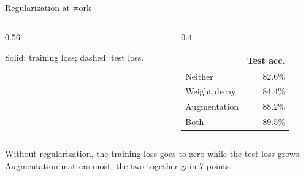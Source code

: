\documentclass[11pt,aspectratio=169]{beamer}
\begin{document}
\begin{frame}{Regularization at work}
\begin{columns}[c,onlytextwidth]
\begin{column}{0.56\textwidth}
            {\scriptsize Solid: training loss; dashed: test loss.\par}
        \end{column}
        \begin{column}{0.4\textwidth}
            \centering
            \small
            \renewcommand{\arraystretch}{1.3}
            \begin{tabular}{@{}lr@{}}
                                      & \textbf{Test acc.} \\
                \hline
                Neither               & 82.6\%             \\
                Weight decay          & 84.4\%             \\
                Augmentation          & 88.2\%             \\
                Both                  & 89.5\%             \\
            \end{tabular}
        \end{column}
    \end{columns}

    \begin{tcolorbox}[nndsgreen]
        Without regularization, the training loss goes to zero while the test
        loss grows. Augmentation matters most; the two together gain 7 points.
    \end{tcolorbox}

\end{frame}
\end{document}
